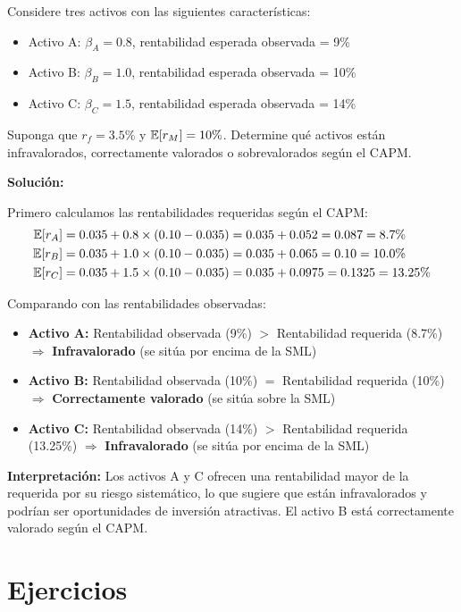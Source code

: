 \begin{ejemplo}
Considere tres activos con las siguientes características:
\begin{itemize}
\item Activo A: $\beta_A = 0.8$, rentabilidad esperada observada = 9\%
\item Activo B: $\beta_B = 1.0$, rentabilidad esperada observada = 10\%
\item Activo C: $\beta_C = 1.5$, rentabilidad esperada observada = 14\%
\end{itemize}

Suponga que $r_f = 3.5\%$ y $\mathbb{E}[r_M] = 10\%$. Determine qué activos están infravalorados, correctamente valorados o sobrevalorados según el CAPM.

\textbf{Solución:}

Primero calculamos las rentabilidades requeridas según el CAPM:
\begin{align*}
\mathbb{E}[r_A] &= 0.035 + 0.8 \times (0.10 - 0.035) = 0.035 + 0.052 = 0.087 = 8.7\% \\
\mathbb{E}[r_B] &= 0.035 + 1.0 \times (0.10 - 0.035) = 0.035 + 0.065 = 0.10 = 10.0\% \\
\mathbb{E}[r_C] &= 0.035 + 1.5 \times (0.10 - 0.035) = 0.035 + 0.0975 = 0.1325 = 13.25\%
\end{align*}

Comparando con las rentabilidades observadas:
\begin{itemize}
\item \textbf{Activo A:} Rentabilidad observada (9\%) $>$ Rentabilidad requerida (8.7\%) $\Rightarrow$ \textbf{Infravalorado} (se sitúa por encima de la SML)
\item \textbf{Activo B:} Rentabilidad observada (10\%) $=$ Rentabilidad requerida (10\%) $\Rightarrow$ \textbf{Correctamente valorado} (se sitúa sobre la SML)
\item \textbf{Activo C:} Rentabilidad observada (14\%) $>$ Rentabilidad requerida (13.25\%) $\Rightarrow$ \textbf{Infravalorado} (se sitúa por encima de la SML)
\end{itemize}

\textbf{Interpretación:} Los activos A y C ofrecen una rentabilidad mayor de la requerida por su riesgo sistemático, lo que sugiere que están infravalorados y podrían ser oportunidades de inversión atractivas. El activo B está correctamente valorado según el CAPM.
\end{ejemplo}

\section{Ejercicios}


